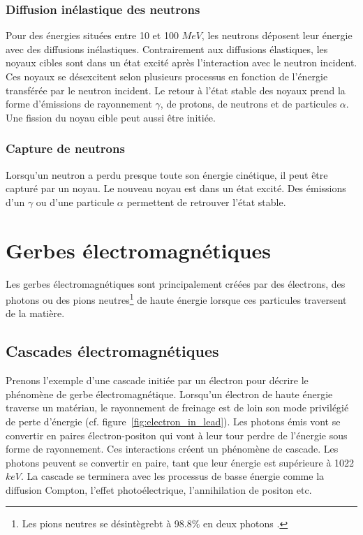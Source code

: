 \subsubsection{Diffusion inélastique des neutrons}
Pour des énergies situées entre 10 et 100 $MeV$, les neutrons déposent leur énergie avec des diffusions inélastiques. Contrairement aux diffusions élastiques, les noyaux cibles sont dans un état excité après l'interaction avec le neutron incident. Ces noyaux se désexcitent selon plusieurs processus en fonction de l'énergie transférée par le neutron incident. Le retour à l’état stable des noyaux prend la forme d'émissions de rayonnement $\gamma$, de protons, de neutrons et de particules $\alpha$. Une fission du noyau cible peut aussi être initiée. 
\subsubsection{Capture de neutrons}
Lorsqu'un neutron a perdu presque toute son énergie cinétique, il peut être capturé par un noyau. Le nouveau noyau est dans un état excité. Des émissions d'un $\gamma$ ou d'une particule $\alpha$ permettent de retrouver l'état stable.

\section{Gerbes électromagnétiques}
Les gerbes électromagnétiques sont principalement créées par des électrons, des photons ou des pions neutres\footnote{Les pions neutres se désintègrebt à 98.8$\%$ en deux photons \cite{pdg}.} de haute énergie lorsque ces particules traversent de la matière.
\subsection{Cascades électromagnétiques}
Prenons l'exemple d'une cascade initiée par un électron pour décrire le phénomène de gerbe électromagnétique. Lorsqu'un électron de haute énergie traverse un matériau, le rayonnement de freinage est de loin son mode privilégié de perte d'énergie (cf. figure~\ref{fig:electron_in_lead}). Les photons émis vont se convertir en paires électron-positon qui vont à leur tour perdre de l'énergie sous forme de rayonnement. Ces interactions créent un phénomène de cascade. Les photons peuvent se convertir en paire, tant que leur énergie est supérieure à 1022 $keV$. La cascade se terminera avec les processus de basse énergie comme la diffusion Compton, l'effet photoélectrique, l'annihilation de positon etc.

